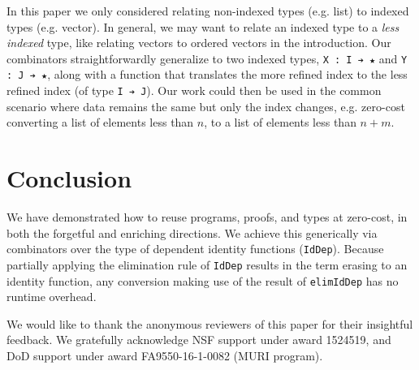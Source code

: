 \documentclass[acmsmall]{acmart}\settopmatter{}
\newcommand{\labsec}[1]{\label{sec:#1}}
\begin{document}
In this paper we only considered relating non-indexed types (e.g. list)
to indexed types (e.g. vector). In general, we may want to relate
an indexed type to a \textit{less indexed} type, like relating vectors
to ordered vectors in the introduction. Our combinators
straightforwardly generalize to two indexed types, \verb;X : I ➔ ★; and
\verb;Y : J ➔ ★;, along with a function that translates
the more refined index to the less refined index
(of type \verb;I ➔ J;). Our work could then be used in the common
scenario where data remains the same but only the index changes,
e.g. zero-cost converting a list of elements less than $n$, to a list
of elements less than $n + m$.

\section{Conclusion}

We have demonstrated how to reuse programs, proofs, and types at
zero-cost, in both the forgetful and enriching directions. We achieve
this generically via combinators over the type of dependent identity
functions (\verb;IdDep;). Because partially applying the elimination
rule of \verb;IdDep; results in the term erasing to an identity
function, any conversion making use of the result of \verb;elimIdDep;
has no runtime overhead.

\labsec{conc}

\begin{acks}
  We would like to thank the anonymous reviewers of this paper for
  their insightful feedback.  We gratefully acknowledge NSF support
  under award 1524519, and DoD support under award FA9550-16-1-0082
  (MURI program).
\end{acks}





\end{document}
